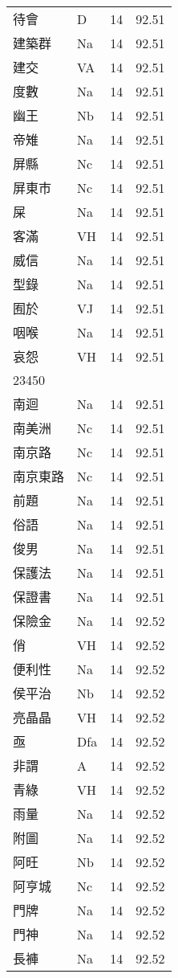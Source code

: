 \documentclass[twocolumn]{book}
\begin{document}
\begin{supertabular}{llrr}
待會 & D & 14 &  92.51\\
建築群 & Na & 14 &  92.51\\
建交 & VA & 14 &  92.51\\
度數 & Na & 14 &  92.51\\
幽王 & Nb & 14 &  92.51\\
帝雉 & Na & 14 &  92.51\\
屏縣 & Nc & 14 &  92.51\\
屏東市 & Nc & 14 &  92.51\\
屎 & Na & 14 &  92.51\\
客滿 & VH & 14 &  92.51\\
威信 & Na & 14 &  92.51\\
型錄 & Na & 14 &  92.51\\
囿於 & VJ & 14 &  92.51\\
咽喉 & Na & 14 &  92.51\\
哀怨 & VH & 14 &  92.51\\
23450\\
南迴 & Na & 14 &  92.51\\
南美洲 & Nc & 14 &  92.51\\
南京路 & Nc & 14 &  92.51\\
南京東路 & Nc & 14 &  92.51\\
前題 & Na & 14 &  92.51\\
俗語 & Na & 14 &  92.51\\
俊男 & Na & 14 &  92.51\\
保護法 & Na & 14 &  92.51\\
保證書 & Na & 14 &  92.51\\
保險金 & Na & 14 &  92.52\\
俏 & VH & 14 &  92.52\\
便利性 & Na & 14 &  92.52\\
侯平治 & Nb & 14 &  92.52\\
亮晶晶 & VH & 14 &  92.52\\
亟 & Dfa & 14 &  92.52\\
非謂 & A & 14 &  92.52\\
青綠 & VH & 14 &  92.52\\
雨量 & Na & 14 &  92.52\\
附圖 & Na & 14 &  92.52\\
阿旺 & Nb & 14 &  92.52\\
阿亨城 & Nc & 14 &  92.52\\
門牌 & Na & 14 &  92.52\\
門神 & Na & 14 &  92.52\\
長褲 & Na & 14 &  92.52\\

\end{supertabular}
\end{document}
